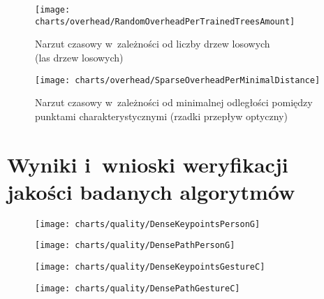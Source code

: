     \begin{figure}[!ht]
      \centering
      \texttt{[image: charts/overhead/RandomOverheadPerTrainedTreesAmount]}
      \caption[Narzut czasowy w~zależności od liczby drzew losowych]
              {Narzut czasowy w~zależności od liczby drzew losowych\\(las drzew losowych)}
      \label{fig:SpecialisedRandomOverhead}
    \end{figure}

    \begin{figure}[!ht]
      \centering
      \texttt{[image: charts/overhead/SparseOverheadPerMinimalDistance]}
      \caption[Narzut czasowy w~zależności od minimalnej odległości pomiędzy punktami charakterystycznymi]
              {Narzut czasowy w~zależności od minimalnej odległości pomiędzy punktami charakterystycznymi (rzadki przepływ optyczny)}
      \label{fig:SpecialisedSparseOverhead}
    \end{figure}

  \section{Wyniki i~wnioski weryfikacji jakości badanych algorytmów}\label{Section_Quality}

    \newpage
    \begin{figure}[!ht]
      \centering
      \texttt{[image: charts/quality/DenseKeypointsPersonG]}
      \caption[]
              {}
      \label{fig:DenseKeypointsPersonG}
    \end{figure}

    \begin{figure}[!ht]
      \centering
      \texttt{[image: charts/quality/DensePathPersonG]}
      \caption[]
              {}
      \label{fig:DensePathPersonG}
    \end{figure}

    \newpage
    \begin{figure}[!ht]
      \centering
      \texttt{[image: charts/quality/DenseKeypointsGestureC]}
      \caption[]
              {}
      \label{fig:DenseKeypointsGestureC}
    \end{figure}

    \begin{figure}[!ht]
      \centering
      \texttt{[image: charts/quality/DensePathGestureC]}
      \caption[]
              {}
      \label{fig:DensePathGestureC}
    \end{figure}

